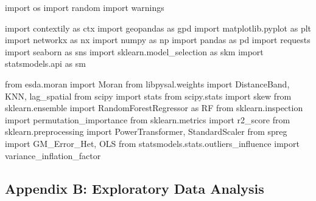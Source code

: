 \documentclass[
  number]{elsarticle}
\newenvironment{Shaded}{\begin{snugshade}}{\end{snugshade}}
\newcommand{\ImportTok}[1]{\textcolor[rgb]{0.00,0.46,0.62}{#1}}
\newcommand{\NormalTok}[1]{\textcolor[rgb]{0.00,0.23,0.31}{#1}}
\begin{document}
\begin{Shaded}
\begin{Highlighting}[]
\ImportTok{import}\NormalTok{ os}
\ImportTok{import}\NormalTok{ random}
\ImportTok{import}\NormalTok{ warnings}

\ImportTok{import}\NormalTok{ contextily }\ImportTok{as}\NormalTok{ ctx}
\ImportTok{import}\NormalTok{ geopandas }\ImportTok{as}\NormalTok{ gpd}
\ImportTok{import}\NormalTok{ matplotlib.pyplot }\ImportTok{as}\NormalTok{ plt}
\ImportTok{import}\NormalTok{ networkx }\ImportTok{as}\NormalTok{ nx}
\ImportTok{import}\NormalTok{ numpy }\ImportTok{as}\NormalTok{ np}
\ImportTok{import}\NormalTok{ pandas }\ImportTok{as}\NormalTok{ pd}
\ImportTok{import}\NormalTok{ requests}
\ImportTok{import}\NormalTok{ seaborn }\ImportTok{as}\NormalTok{ sns}
\ImportTok{import}\NormalTok{ sklearn.model\_selection }\ImportTok{as}\NormalTok{ skm}
\ImportTok{import}\NormalTok{ statsmodels.api }\ImportTok{as}\NormalTok{ sm}

\ImportTok{from}\NormalTok{ esda.moran }\ImportTok{import}\NormalTok{ Moran}
\ImportTok{from}\NormalTok{ libpysal.weights }\ImportTok{import}\NormalTok{ DistanceBand, KNN, lag\_spatial}
\ImportTok{from}\NormalTok{ scipy }\ImportTok{import}\NormalTok{ stats}
\ImportTok{from}\NormalTok{ scipy.stats }\ImportTok{import}\NormalTok{ skew}
\ImportTok{from}\NormalTok{ sklearn.ensemble }\ImportTok{import}\NormalTok{ RandomForestRegressor }\ImportTok{as}\NormalTok{ RF}
\ImportTok{from}\NormalTok{ sklearn.inspection }\ImportTok{import}\NormalTok{ permutation\_importance}
\ImportTok{from}\NormalTok{ sklearn.metrics }\ImportTok{import}\NormalTok{ r2\_score}
\ImportTok{from}\NormalTok{ sklearn.preprocessing }\ImportTok{import}\NormalTok{ PowerTransformer, StandardScaler}
\ImportTok{from}\NormalTok{ spreg }\ImportTok{import}\NormalTok{ GM\_Error\_Het, OLS}
\ImportTok{from}\NormalTok{ statsmodels.stats.outliers\_influence }\ImportTok{import}\NormalTok{ variance\_inflation\_factor}
\end{Highlighting}
\end{Shaded}

\subsection{Appendix B: Exploratory Data Analysis}\label{sec-eda}
\end{document}
